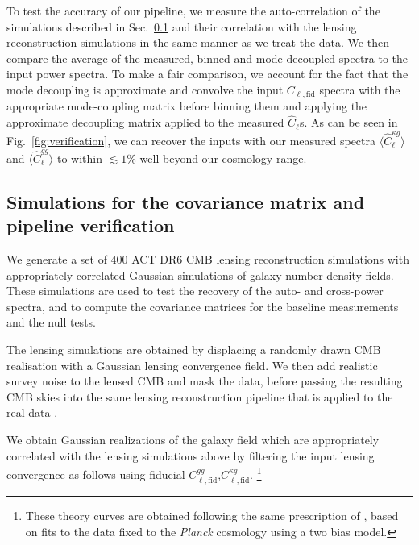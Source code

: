 \documentclass[twocolumn]{aastex631}
\begin{document}
{To test the accuracy of our pipeline, we measure the auto-correlation of the simulations described in Sec.~\ref{sec. sim} and their correlation with the lensing reconstruction simulations in the same manner as we treat the data. We then compare the average of the measured, binned and mode-decoupled spectra to the input power spectra. To make a fair comparison, we account for the fact that the mode decoupling is approximate and convolve the input  $C_{\ell,\mathrm{fid}}$ spectra with the appropriate mode-coupling matrix before binning them and applying the approximate decoupling matrix applied to the measured $\hat{C}_\ell$s. As can be seen in Fig.~\ref{fig:verification}, we can recover the inputs with our measured spectra $\langle{\hat{C}^{\kappa{g}}_\ell}\rangle$ and $\langle{\hat{C}^{g{g}}_\ell}\rangle$ to within $\lesssim
1\%$ well beyond our cosmology range.


\subsection{Simulations for the covariance matrix and pipeline verification}\label{sec. sim}

We generate a set of 400 ACT DR6 CMB lensing reconstruction simulations with appropriately correlated Gaussian simulations of galaxy number density fields. These simulations are used to test the recovery of the auto- and cross-power spectra, and to compute the covariance matrices for the baseline measurements and the null tests.

The lensing simulations are obtained by displacing a randomly drawn CMB realisation with a Gaussian lensing convergence field. We then add realistic survey noise to the lensed CMB \citep{Atkins:2023yzu} and mask the data, before passing the resulting CMB skies into the same lensing reconstruction pipeline that is applied to the real data \citep{qu2023atacama}.

We obtain Gaussian realizations of the galaxy field which are appropriately correlated  with the lensing simulations above by filtering the input lensing convergence as follows using fiducial $C^{gg}_{\ell,\mathrm{fid}}$,$C^{\kappa{g}}_{\ell,\mathrm{fid}}$.
\footnote{{These theory curves are obtained following the same prescription of \citep{hang2021}, based on fits to the data fixed to the \textit{Planck} cosmology using a two bias model.}}

}
\end{document}
